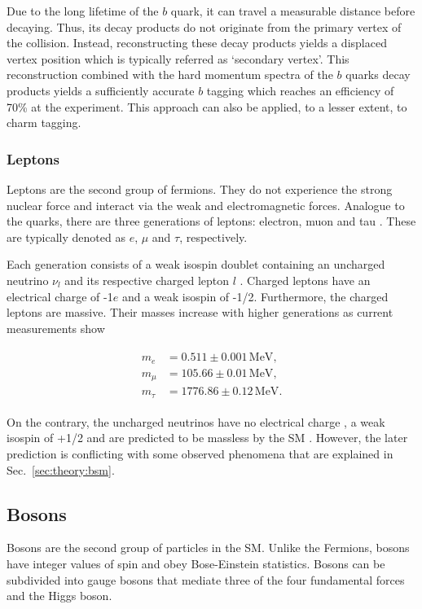 \documentclass[bachelor,ngerman,english]{GAUBM}
\begin{document}
Due to the long lifetime of the $b$ quark, it can travel a measurable distance before decaying. Thus, its decay products do not originate from the primary vertex of the collision. Instead, reconstructing these decay products yields a displaced vertex position which is typically referred as `secondary vertex'. This reconstruction combined with the hard momentum spectra of the $b$ quarks decay products yields a sufficiently accurate $b$ tagging which reaches an efficiency of 70\% \cite{btag:performance} at the \atlas experiment. This approach can also be applied, to a lesser extent, to charm tagging. 


\subsubsection*{Leptons}
Leptons are the second group of fermions. They do not experience the strong nuclear force and interact via the weak and electromagnetic forces. Analogue to the quarks, there are three generations of leptons: electron, muon and tau \cite{theory:general_sm}. These are typically denoted as $e$, $\mu$ and $\tau$, respectively.

Each generation consists of a weak isospin doublet containing an uncharged neutrino $\nu_l$ and its respective charged lepton $l$ \cite{theory:general_sm}. Charged leptons have an electrical charge of -1$e$ and a weak isospin of -1/2. Furthermore, the charged leptons are massive. Their masses increase with higher generations as current measurements \cite{pdg} show

\begin{gather}
    \begin{aligned}
        m_e     &=0.511\pm0.001\,\text{MeV},\\
        m_\mu   &=105.66\pm0.01\,\text{MeV},\\
        m_\tau  &=1776.86\pm0.12\,\text{MeV}.
        \label{eq:mass_leptons}
    \end{aligned}
\end{gather}

On the contrary, the uncharged neutrinos have no electrical charge \cite{pdg}, a weak isospin of +1/2 and are predicted to be massless by the SM \cite{theory:general_sm}. However, the later prediction is conflicting with some observed phenomena that are explained in Sec.~\ref{sec:theory:bsm}.


\subsection*{Bosons}
Bosons are the second group of particles in the SM. Unlike the Fermions, bosons have integer values of spin and obey Bose-Einstein statistics. Bosons can be subdivided into gauge bosons that mediate three of the four fundamental forces and the Higgs boson. %
\end{document}
